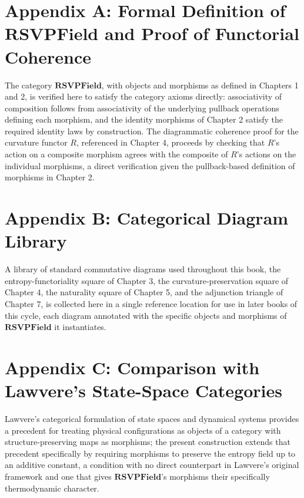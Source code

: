 \chapter*{Appendix A: Formal Definition of $\mathbf{RSVPField}$ and Proof of Functorial Coherence}

The category $\mathbf{RSVPField}$, with objects and morphisms as defined in Chapters 1 and 2, is verified here to satisfy the category axioms directly: associativity of composition follows from associativity of the underlying pullback operations defining each morphism, and the identity morphisms of Chapter 2 satisfy the required identity laws by construction. The diagrammatic coherence proof for the curvature functor $R$, referenced in Chapter 4, proceeds by checking that $R$'s action on a composite morphism agrees with the composite of $R$'s actions on the individual morphisms, a direct verification given the pullback-based definition of morphisms in Chapter 2.

\chapter*{Appendix B: Categorical Diagram Library}

A library of standard commutative diagrams used throughout this book, the entropy-functoriality square of Chapter 3, the curvature-preservation square of Chapter 4, the naturality square of Chapter 5, and the adjunction triangle of Chapter 7, is collected here in a single reference location for use in later books of this cycle, each diagram annotated with the specific objects and morphisms of $\mathbf{RSVPField}$ it instantiates.

\chapter*{Appendix C: Comparison with Lawvere's State-Space Categories}

Lawvere's categorical formulation of state spaces and dynamical systems provides a precedent for treating physical configurations as objects of a category with structure-preserving maps as morphisms; the present construction extends that precedent specifically by requiring morphisms to preserve the entropy field up to an additive constant, a condition with no direct counterpart in Lawvere's original framework and one that gives $\mathbf{RSVPField}$'s morphisms their specifically thermodynamic character.

